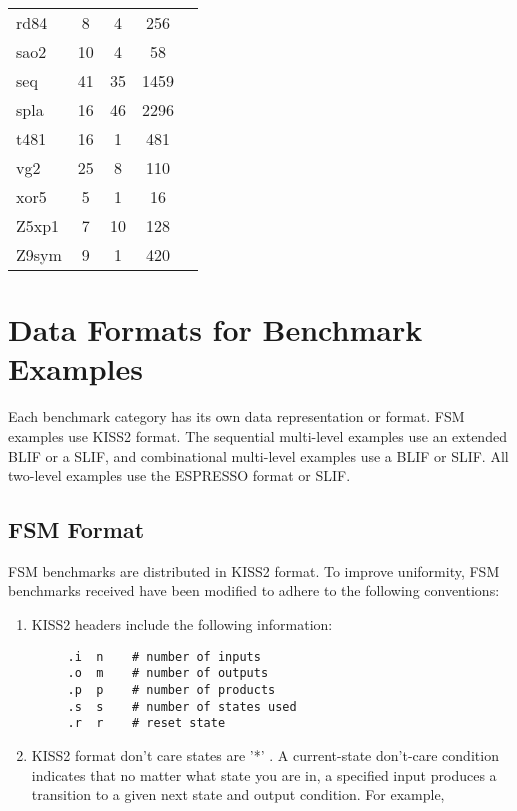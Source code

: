 {\begin{pespace}
\begin{center}
\begin{tabular}{|l|c|c|c|c|}
rd84        &  8          &    4         & 256  \\
sao2        &  10         &    4         & 58   \\
seq         &  41         &   35         & 1459 \\
spla        &  16         &   46         & 2296 \\
t481        &  16         &    1         & 481  \\
vg2         &  25         &    8         & 110  \\
xor5        &  5          &    1         & 16   \\
Z5xp1       &  7          &   10         & 128  \\
Z9sym       &  9          &    1         & 420  \\
\hline
\end{tabular}
\end{center}


\newpage
\section{ Data Formats for Benchmark Examples }
Each benchmark category has its own data representation or format.
FSM examples use KISS2 format.
The sequential multi-level examples use an extended BLIF or a SLIF, and
combinational multi-level examples use a BLIF or SLIF.
All two-level examples use the ESPRESSO format or SLIF.


\subsection{ FSM Format }

FSM benchmarks are distributed in KISS2 format.
To improve uniformity, 
FSM benchmarks received
have been modified to adhere to the following conventions:

\begin{enumerate}

\item  KISS2 headers include the following information:

\begin{verbatim}
     .i  n    # number of inputs
     .o  m    # number of outputs
     .p  p    # number of products
     .s  s    # number of states used
     .r  r    # reset state
\end{verbatim}

\item KISS2 format don't care states are '*' .   A current-state don't-care
   condition indicates that no matter what state you are in, a specified
   input produces a transition to a given next state and output condition.
   For example,
    

\end{enumerate}
\end{pespace}}
